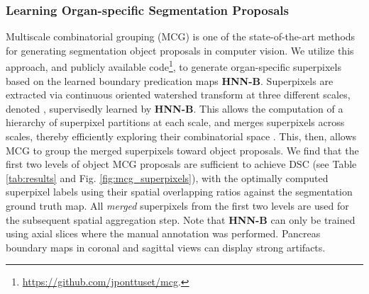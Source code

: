 \documentclass[journal]{IEEEtran}
\begin{document}
\subsubsection{Learning Organ-specific Segmentation Proposals}\label{sec:segPro} Multiscale combinatorial grouping (MCG) \cite{pont-tuset2015mcg} is one of the state-of-the-art methods for generating segmentation object proposals in computer vision. We utilize this approach, and publicly available code\footnote{\scriptsize\url{https://github.com/jponttuset/mcg}.}, to generate organ-specific superpixels based on the learned boundary predication maps \textbf{HNN-B}. Superpixels are extracted via continuous oriented watershed transform at three different scales, denoted , supervisedly learned by \textbf{HNN-B}. This allows the computation of a hierarchy of superpixel partitions at each scale, and merges superpixels across scales, thereby efficiently exploring their combinatorial space \cite{pont-tuset2015mcg}. This, then, allows MCG to group the merged superpixels toward object proposals. We find that the first two levels of object MCG proposals are sufficient to achieve  DSC (see Table \ref{tab:results} and Fig. \ref{fig:mcg_superpixels}), with the optimally computed superpixel labels using their spatial overlapping ratios against the segmentation ground truth map. All \textit{merged} superpixels  from the first two levels are used for the subsequent spatial aggregation step. Note that \textbf{HNN-B} can only be trained using axial slices where the manual annotation was performed. Pancreas boundary maps in coronal and sagittal views can display strong artifacts.
\end{document}
